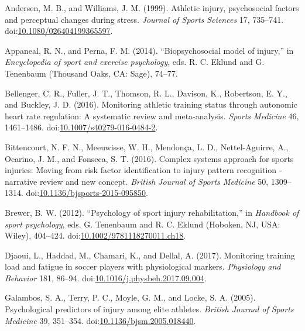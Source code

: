 \documentclass[utf8]{frontiersHLTH}
\begin{document}
\leavevmode\hypertarget{ref-Andersen1999}{}%
Andersen, M. B., and Williams, J. M. (1999). Athletic injury,
psychosocial factors and perceptual changes during stress. \emph{Journal
of Sports Sciences} 17, 735--741.
doi:\href{https://doi.org/10.1080/026404199365597}{10.1080/026404199365597}.

\leavevmode\hypertarget{ref-Appaneal2014}{}%
Appaneal, R. N., and Perna, F. M. (2014). ``Biopsychosocial model of
injury,'' in \emph{Encyclopedia of sport and exercise psychology}, eds.
R. C. Eklund and G. Tenenbaum (Thousand Oaks, CA: Sage), 74--77.

\leavevmode\hypertarget{ref-Bellenger2016}{}%
Bellenger, C. R., Fuller, J. T., Thomson, R. L., Davison, K., Robertson,
E. Y., and Buckley, J. D. (2016). Monitoring athletic training status
through autonomic heart rate regulation: A systematic review and
meta-analysis. \emph{Sports Medicine} 46, 1461--1486.
doi:\href{https://doi.org/10.1007/s40279-016-0484-2}{10.1007/s40279-016-0484-2}.

\leavevmode\hypertarget{ref-Bittencourt2016}{}%
Bittencourt, N. F. N., Meeuwisse, W. H., Mendonça, L. D.,
Nettel-Aguirre, A., Ocarino, J. M., and Fonseca, S. T. (2016). Complex
systems approach for sports injuries: Moving from risk factor
identification to injury pattern recognition - narrative review and new
concept. \emph{British Journal of Sports Medicine} 50, 1309--1314.
doi:\href{https://doi.org/10.1136/bjsports-2015-095850}{10.1136/bjsports-2015-095850}.

\leavevmode\hypertarget{ref-Brewer2012}{}%
Brewer, B. W. (2012). ``Psychology of sport injury rehabilitation,'' in
\emph{Handbook of sport psychology}, eds. G. Tenenbaum and R. C. Eklund
(Hoboken, NJ, USA: Wiley), 404--424.
doi:\href{https://doi.org/10.1002/9781118270011.ch18}{10.1002/9781118270011.ch18}.

\leavevmode\hypertarget{ref-Djaoui2017}{}%
Djaoui, L., Haddad, M., Chamari, K., and Dellal, A. (2017). Monitoring
training load and fatigue in soccer players with physiological markers.
\emph{Physiology and Behavior} 181, 86--94.
doi:\href{https://doi.org/10.1016/j.physbeh.2017.09.004}{10.1016/j.physbeh.2017.09.004}.

\leavevmode\hypertarget{ref-Galambos2005}{}%
Galambos, S. A., Terry, P. C., Moyle, G. M., and Locke, S. A. (2005).
Psychological predictors of injury among elite athletes. \emph{British
Journal of Sports Medicine} 39, 351--354.
doi:\href{https://doi.org/10.1136/bjsm.2005.018440}{10.1136/bjsm.2005.018440}.
\end{document}
